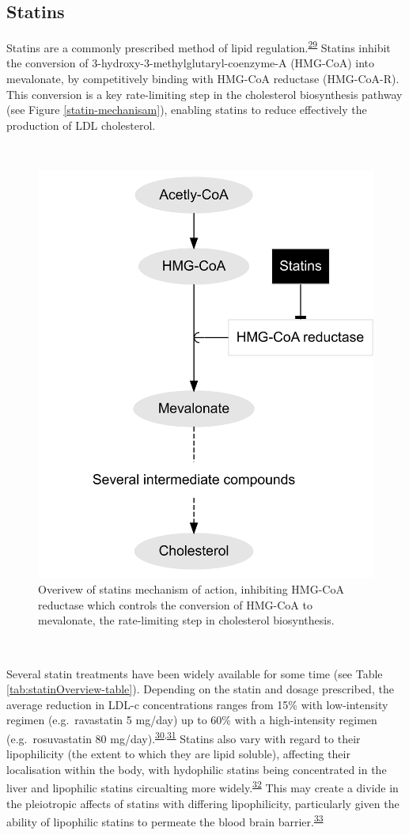 \documentclass[a4paper, twoside]{templates/ociamthesis}
\begin{document}
\hypertarget{intro-statins}{%
\subsection{Statins}\label{intro-statins}}

Statins are a commonly prescribed method of lipid regulation.\textsuperscript{\protect\hyperlink{ref-collins2016}{29}} Statins inhibit the conversion of 3-hydroxy-3-methylglutaryl-coenzyme-A (HMG-CoA) into mevalonate, by competitively binding with HMG-CoA reductase (HMG-CoA-R). This conversion is a key rate-limiting step in the cholesterol biosynthesis pathway (see Figure \ref{statin-mechanisam}), enabling statins to reduce effectively the production of LDL cholesterol.

~





\begin{figure}[H]

{\centering \includegraphics[width=0.5\linewidth]{figures/background/statinPath} 

}

\caption[Statin mechanism of action]{Overivew of statins mechanism of action, inhibiting HMG-CoA reductase which controls the conversion of HMG-CoA to mevalonate, the rate-limiting step in cholesterol biosynthesis.}\label{fig:statin-mechanisam}
\end{figure}

~

Several statin treatments have been widely available for some time (see Table \ref{tab:statinOverview-table}). Depending on the statin and dosage prescribed, the average reduction in LDL-c concentrations ranges from 15\% with low-intensity regimen (e.g.~ravastatin 5 mg/day) up to 60\% with a high-intensity regimen (e.g.~rosuvastatin 80 mg/day).\textsuperscript{\protect\hyperlink{ref-collins2016a}{30},\protect\hyperlink{ref-law2003}{31}} Statins also vary with regard to their lipophilicity (the extent to which they are lipid soluble), affecting their localisation within the body, with hydophilic statins being concentrated in the liver and lipophilic statins circualting more widely.\textsuperscript{\protect\hyperlink{ref-schachter2005}{32}} This may create a divide in the pleiotropic affects of statins with differing lipophilicity, particularly given the ability of lipophilic statins to permeate the blood brain barrier.\textsuperscript{\protect\hyperlink{ref-sierra2011}{33}}
\end{document}

